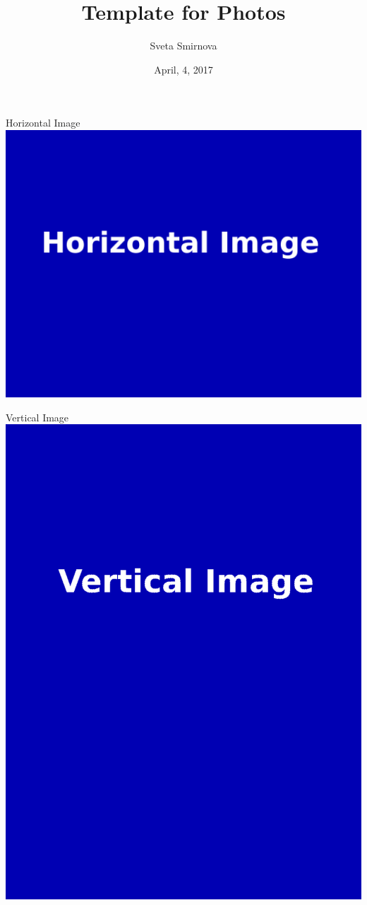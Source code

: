 \documentclass{beamer}
\title[InnoDB Troubleshooting]{Template for Photos}
\author{Sveta Smirnova}
\date{April, 4, 2017}
\begin{document}
	
	\begin{frame}
		\titlepage
	\end{frame}
	
	\begin{frame}{Horizontal Image}
		\hfill\includegraphics[width=0.81\paperwidth]{horizontal.png}\hspace*{\fill}
	\end{frame}
	
	\begin{frame}{Vertical Image}
		\hfill\includegraphics[width=0.455\paperwidth]{vertical.png}\hspace*{\fill}
	\end{frame}
\end{document}
